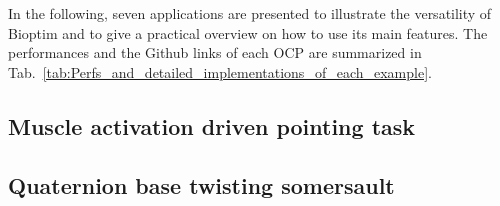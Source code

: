 In the following, seven applications are presented to illustrate the versatility of Bioptim and to give a practical overview on how to use its main features.
The performances and the Github links of each OCP are summarized in Tab.~\ref{tab:Perfs_and_detailed_implementations_of_each_example}.


\subsection{Muscle activation driven pointing task}


\subsection{Quaternion base twisting somersault}


